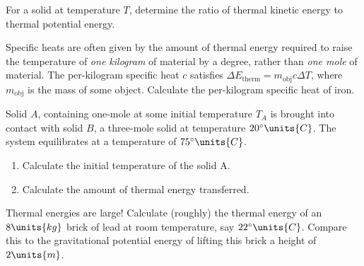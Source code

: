 \begin{problem}
  For a solid at temperature $T$, determine the ratio of
  thermal kinetic energy to thermal potential energy.
\end{problem}


\begin{problem}
Specific heats are often given by the amount of thermal energy
required to raise the temperature of {\it one kilogram} of material by
a degree, rather than {\it one mole} of material.  The per-kilogram
specific heat $c$ satisfies $\Delta E_\text{therm} = m_\text{obj} c
\Delta T$, where $m_\text{obj}$ is the mass of some object. Calculate
the per-kilogram specific heat of iron.
\end{problem}


\begin{problem}
  Solid $A$, containing one-mole at some initial temperature $T_A$ is
  brought into contact with solid $B$, a three-mole solid at
  temperature $20^\circ\units{C}$.  The system equilibrates at a
  temperature of $75^\circ\units{C}$.
\begin{enumerate}
\item Calculate the initial temperature of the solid A.
\item Calculate the amount of thermal energy transferred.
\end{enumerate}
\end{problem}


\begin{problem}
Thermal energies are large!  Calculate (roughly) the thermal energy of an
$8\units{kg}$ brick of lead at room temperature, say
$22^\circ\units{C}$.  Compare this to the gravitational potential
energy of lifting this brick a height of $2\units{m}$.
\end{problem}

